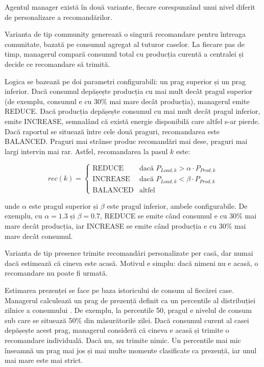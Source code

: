 \documentclass[12pt,a4paper]{report}
\begin{document}
Agentul manager există în două variante, fiecare corespunzând unui nivel diferit de personalizare a recomandărilor.

Varianta de tip community generează o singură recomandare pentru întreaga comunitate, bazată pe consumul agregat al tuturor caselor. La fiecare pas de timp, managerul compară consumul total cu producția curentă a centralei și decide ce recomandare să trimită.

Logica se bazează pe doi parametri configurabili: un prag superior și un prag inferior. Dacă consumul depășește producția cu mai mult decât pragul superior (de exemplu, consumul e cu 30\% mai mare decât producția), managerul emite REDUCE. Dacă producția depășește consumul cu mai mult decât pragul inferior, emite INCREASE, semnalând că există energie disponibilă care altfel s-ar pierde. Dacă raportul se situează între cele două praguri, recomandarea este BALANCED. Praguri mai strânse produc recomandări mai dese, praguri mai largi intervin mai rar. Astfel, recomandarea la pasul $k$ este:

\begin{equation}
  rec(k) = \begin{cases}
    \text{REDUCE}   & \text{dacă } P_{Load,k} > \alpha \cdot P_{Prod,k} \\
    \text{INCREASE} & \text{dacă } P_{Load,k} < \beta \cdot P_{Prod,k}  \\
    \text{BALANCED} & \text{altfel}
  \end{cases}
  \label{eq:rec}
\end{equation}

unde $\alpha$ este pragul superior și $\beta$ este pragul inferior, ambele configurabile. De exemplu, cu $\alpha = 1.3$ și $\beta = 0.7$, REDUCE se emite când consumul e cu 30\% mai mare decât producția, iar INCREASE se emite când producția e cu 30\% mai mare decât consumul.

Varianta de tip presence trimite recomandări personalizate per casă, dar numai dacă estimează că cineva este acasă. Motivul e simplu: dacă nimeni nu e acasă, o recomandare nu poate fi urmată.

Estimarea prezenței se face pe baza istoricului de consum al fiecărei case. Managerul calculează un prag de prezență definit ca un percentile al distribuției zilnice a consumului \cite{murphy2012ml}. De exemplu, la percentile 50, pragul e nivelul de consum sub care se situează 50\% din măsurătorile zilei. Dacă consumul curent al casei depășește acest prag, managerul consideră că cineva e acasă și trimite o recomandare individuală. Dacă nu, nu trimite nimic. Un percentile mai mic înseamnă un prag mai jos și mai multe momente clasificate ca prezență, iar unul mai mare este mai strict.
\end{document}
